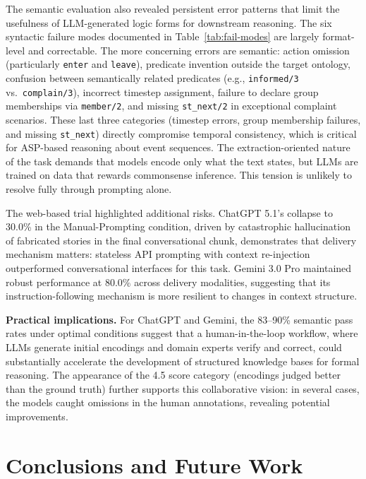 \documentclass[runningheads]{llncs}
\begin{document}
The semantic evaluation also revealed persistent error patterns that limit the
usefulness of LLM-generated logic forms for downstream reasoning. The six
syntactic failure modes documented in Table~\ref{tab:fail-modes} are largely
format-level and correctable. The more concerning errors are semantic: action
omission (particularly \texttt{enter} and \texttt{leave}), predicate invention
outside the target ontology, confusion between semantically related predicates
(e.g., \texttt{informed/3} vs.\ \texttt{complain/3}), incorrect timestep
assignment, failure to declare group memberships via \texttt{member/2}, and
missing \texttt{st\_next/2} in exceptional complaint scenarios. These last
three categories (timestep errors, group membership failures, and missing
\texttt{st\_next}) directly compromise temporal consistency, which is critical
for ASP-based reasoning about event sequences. The extraction-oriented nature
of the task demands that models encode only what the text states, but LLMs are
trained on data that rewards commonsense inference. This tension is unlikely
to resolve fully through prompting alone.

The web-based trial highlighted additional risks. ChatGPT 5.1's collapse to
30.0\% in the Manual-Prompting condition, driven by catastrophic hallucination
of fabricated stories in the final conversational chunk, demonstrates that
delivery mechanism matters: stateless API prompting with context re-injection
outperformed conversational interfaces for this task. Gemini 3.0 Pro maintained
robust performance at 80.0\% across delivery modalities, suggesting that its
instruction-following mechanism is more resilient to changes in context
structure.

\noindent\textbf{Practical implications.}  For ChatGPT and Gemini, the 83--90\%
semantic pass rates under optimal conditions suggest that a human-in-the-loop
workflow, where LLMs generate initial encodings and domain experts verify and
correct, could substantially accelerate the development of structured
knowledge bases for formal reasoning.  The appearance of the 4.5 score
category (encodings judged better than the ground truth) further supports
this collaborative vision: in several cases, the models caught omissions in
the human annotations, revealing potential improvements.


\section{Conclusions and Future Work}
\label{sec:conclusions}
\end{document}
